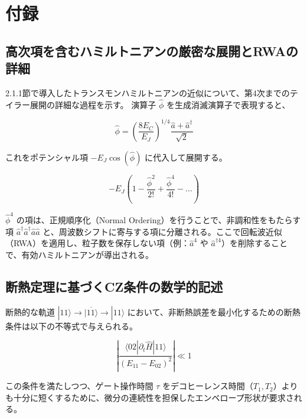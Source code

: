 \section{付録}
\subsection{高次項を含むハミルトニアンの厳密な展開とRWAの詳細}
2.1.1節で導入したトランスモンハミルトニアンの近似について、第4次までのテイラー展開の詳細な過程を示す。
演算子 $\hat{\phi}$ を生成消滅演算子で表現すると、

\begin{equation}
  \hat{\phi} = \left(\frac{8E_C}{E_J}\right)^{1/4} \frac{\hat{a} + \hat{a}^\dagger}{\sqrt{2}}
\end{equation}

これをポテンシャル項 $-E_J \cos(\hat{\phi})$ に代入して展開する。

\begin{equation}
  -E_J \left( 1 - \frac{\hat{\phi}^2}{2!} + \frac{\hat{\phi}^4}{4!} - \dots \right)
\end{equation}

$\hat{\phi}^4$ の項は、正規順序化（Normal Ordering）を行うことで、非調和性をもたらす項 $\hat{a}^\dagger \hat{a}^\dagger \hat{a} \hat{a}$ と、周波数シフトに寄与する項に分離される。ここで回転波近似（RWA）を適用し、粒子数を保存しない項（例：$\hat{a}^4$ や $\hat{a}^{\dagger 4}$）を削除することで、有効ハミルトニアンが導出される。

\subsection{断熱定理に基づくCZ条件の数学的記述}
断熱的な軌道 $|11\rangle \rightarrow \overline{|11\rangle} \rightarrow |11\rangle$ において、非断熱誤差を最小化するための断熱条件は以下の不等式で与えられる。

\begin{equation}
  \left| \frac{\langle 02 | \partial_t \hat{H} | 11 \rangle}{(E_{11} - E_{02})^2} \right| \ll 1
\end{equation}

この条件を満たしつつ、ゲート操作時間 $\tau$ をデコヒーレンス時間（$T_1, T_2$）よりも十分に短くするために、微分の連続性を担保したエンベロープ形状が要求される。
